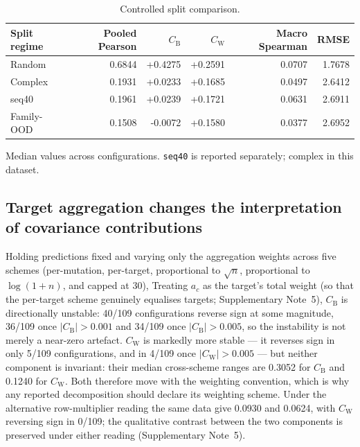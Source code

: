 \documentclass[11pt,a4paper]{article}
\begin{document}
\begin{table}[htbp]
  \centering
  \small
  \begin{threeparttable}
  \caption{Controlled split comparison.}
  \label{tab:split}
  \begin{tabular}{@{}lrrrrr@{}}
    \toprule
    Split regime & Pooled Pearson & $C_{\mathrm{B}}$ & $C_{\mathrm{W}}$
      & Macro Spearman & RMSE \\
    \midrule
Random & 0.6844 & +0.4275 & +0.2591 & 0.0707 & 1.7678 \\
Complex & 0.1931 & +0.0233 & +0.1685 & 0.0497 & 2.6412 \\
seq40 & 0.1961 & +0.0239 & +0.1721 & 0.0631 & 2.6911 \\
Family-OOD & 0.1508 & -0.0072 & +0.1580 & 0.0377 & 2.6952 \\
    \bottomrule
  \end{tabular}
  \begin{tablenotes}\footnotesize
    \item Median values across configurations. \texttt{seq40} is reported separately; complex in
      this dataset.
  \end{tablenotes}
  \end{threeparttable}
\end{table}

\subsection*{Target aggregation changes the interpretation of covariance contributions}

Holding predictions fixed and varying only the aggregation weights across five schemes
(per-mutation, per-target, proportional to $\sqrt{n}$, proportional to $\log(1+n)$, and
capped at 30), Treating $a_c$ as the target's total weight (so that the per-target scheme genuinely
equalises targets; Supplementary Note~5), $C_{\mathrm{B}}$ is directionally unstable:
40/109 configurations reverse sign at some magnitude, 36/109 once
$\lvert C_{\mathrm{B}} \rvert > 0.001$ and 34/109 once
$\lvert C_{\mathrm{B}} \rvert > 0.005$, so the instability is not merely a near-zero
artefact. $C_{\mathrm{W}}$ is markedly more stable --- it reverses sign in only 5/109
configurations, and in 4/109 once $\lvert C_{\mathrm{W}} \rvert > 0.005$ ---
but neither component is invariant: their median cross-scheme ranges are 0.3052 for
$C_{\mathrm{B}}$ and 0.1240 for $C_{\mathrm{W}}$. Both therefore move with the weighting
convention, which is why any reported decomposition should declare its weighting scheme.
Under the alternative row-multiplier reading the same data give 0.0930 and 0.0624,
with $C_{\mathrm{W}}$ reversing sign in 0/109; the qualitative contrast between the two
components is preserved under either reading (Supplementary Note~5).
\end{document}

